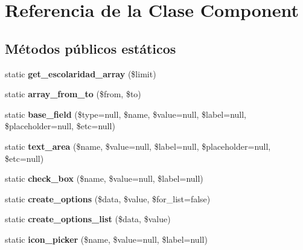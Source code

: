 \hypertarget{class_component}{}\section{Referencia de la Clase Component}
\label{class_component}
\subsection*{Métodos públicos estáticos}
\begin{DoxyCompactItemize}
\item 
\mbox{\label{class_component_ae064083382c242e7e97acc9295e594a1}} 
static {\bfseries get\+\_\+escolaridad\+\_\+array} (\$limit)
\item 
\mbox{\label{class_component_a04038f1b63585dd71fd8fdef85a256a7}} 
static {\bfseries array\+\_\+from\+\_\+to} (\$from, \$to)
\item 
\mbox{\label{class_component_a0e884acdb875c9d620824803a8869460}} 
static {\bfseries base\+\_\+field} (\$type=null, \$name, \$value=null, \$label=null, \$placeholder=null, \$etc=null)
\item 
\mbox{\label{class_component_a488b5031d9bad142450137f9af35904e}} 
static {\bfseries text\+\_\+area} (\$name, \$value=null, \$label=null, \$placeholder=null, \$etc=null)
\item 
\mbox{\label{class_component_a1477baf3a7b3ceb91fd6f564377567d3}} 
static {\bfseries check\+\_\+box} (\$name, \$value=null, \$label=null)
\item 
\mbox{\label{class_component_ae302d074089b7f240b44ee69a7712dce}} 
static {\bfseries create\+\_\+options} (\$data, \$value, \$for\+\_\+list=false)
\item 
\mbox{\label{class_component_a3212ab8134d408df71f56bd97e646832}} 
static {\bfseries create\+\_\+options\+\_\+list} (\$data, \$value)
\item 
\mbox{\label{class_component_a0bc19dbd792364b2f5661fa554e1e1e0}} 
static {\bfseries icon\+\_\+picker} (\$name, \$value=null, \$label=null)
\item 

\end{DoxyCompactItemize}

